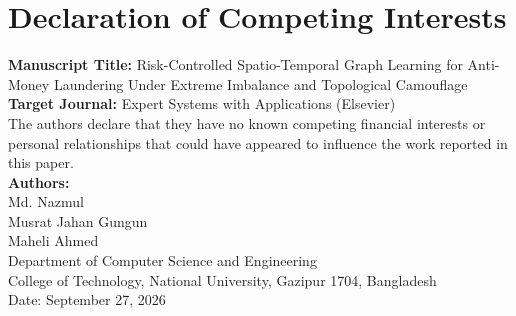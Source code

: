 \documentclass[a4paper,11pt]{article}
\begin{document}
\section*{Declaration of Competing Interests}

\noindent\textbf{Manuscript Title:} Risk-Controlled Spatio-Temporal Graph Learning for Anti-Money Laundering Under Extreme Imbalance and Topological Camouflage\\[1.5ex]
\textbf{Target Journal:} Expert Systems with Applications (Elsevier)\\[2.0ex]

\noindent The authors declare that they have no known competing financial interests or personal relationships that could have appeared to influence the work reported in this paper.\\[3.0ex]

\noindent\textbf{Authors:}\\
Md. Nazmul\\
Musrat Jahan Gungun\\
Maheli Ahmed\\[2.0ex]
Department of Computer Science and Engineering\\
College of Technology, National University, Gazipur 1704, Bangladesh\\[2.0ex]
Date: September 27, 2026
\end{document}
